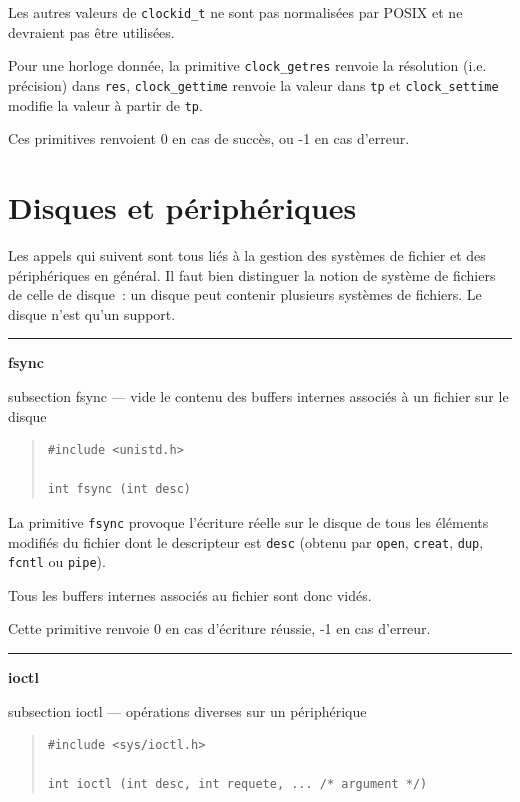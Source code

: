 \documentclass [twoside] {report}
\newcommand {\primitive} [1]
    {
	\phantomsection
	{\large \textbf {#1}}
	\addcontentsline {toc} {subsection} {#1}
    }
\newcommand {\separation}
    {
	\vspace {5mm}
	\nopagebreak
	\hrule
    }
\begin{document}
Les autres valeurs de \verb|clockid_t| ne sont pas normalisées par POSIX
et ne devraient pas être utilisées.

Pour une horloge donnée, la primitive \texttt {clock\_getres} renvoie la
résolution (i.e. précision) dans \texttt {res}, \texttt {clock\_gettime}
renvoie la valeur dans \texttt {tp} et \texttt {clock\_settime} modifie
la valeur à partir de \texttt {tp}.

Ces primitives renvoient 0 en cas de succès, ou -1 en cas d'erreur.



\section {Disques et périphériques}


Les appels qui suivent sont tous liés à la
gestion des systèmes de fichier et des périphériques en
général. Il faut bien distinguer la notion de
système de fichiers de celle de disque~: un disque
peut contenir plusieurs systèmes de fichiers. Le
disque n'est qu'un support.




\separation
\primitive {fsync} --- vide le contenu des buffers internes associés à un fichier sur le disque

\begin {quote}
\begin {verbatim}
#include <unistd.h>

int fsync (int desc)
\end{verbatim}
\end {quote}

La primitive \texttt {fsync} provoque l'écriture réelle
sur le disque de tous les éléments modifiés du fichier dont le
descripteur est \texttt {desc} (obtenu par \texttt {open},
\texttt {creat}, \texttt {dup}, \texttt {fcntl} ou \texttt {pipe}).

Tous les buffers internes associés au fichier
sont donc vidés.

Cette primitive renvoie 0 en cas d'écriture
réussie, -1 en cas d'erreur.




\separation
\primitive {ioctl} --- opérations diverses sur un périphérique

\begin {quote}
\begin {verbatim}
#include <sys/ioctl.h>

int ioctl (int desc, int requete, ... /* argument */)
\end{verbatim}
\end {quote}
\end{document}
